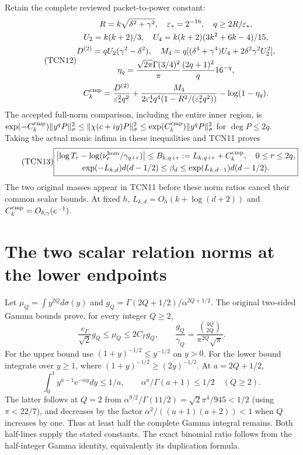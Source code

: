 \documentclass[11pt,a4paper]{article}
\begin{document}
Retain the complete reviewed packet-to-power constant:
\begin{equation}\tag{TCN12}
 \begin{gathered}
 R=k\sqrt{\delta^2+\gamma^2},\quad\varepsilon_*=2^{-16},
 \quad q\ge 2R/\varepsilon_*,\\
 U_2=k(k+2)/3,\quad U_4=k(k+2)(3k^2+6k-4)/15,\\
 D^{(2)}=qU_2(\gamma^2-\delta^2),\quad
 M_4=q[(\delta^4+\gamma^4)U_4+2\delta^2\gamma^2U_2^2],\\
 \eta_q=\frac{\sqrt{2\pi}\Gamma(3/4)^2}{\pi}
                  \frac{(2q+1)^2}{q}16^{-q},\\
 C_k^{\rm cmp}=\frac{D^{(2)}}{\varepsilon_*^2q^2}
 +\frac{M_4}{2\varepsilon_*^4q^4(1-R^2/(\varepsilon_*^2q^2))}
 -\log(1-\eta_q).
 \end{gathered}
\end{equation}
The accepted full-norm comparison, including the entire inner region,
is $\exp(-C_k^{\rm cmp})\|y^qP\|_\sigma^2\le
\|\chi(c+iy)P\|_\sigma^2\le
\exp(C_k^{\rm cmp})\|y^qP\|_\sigma^2$ for $\deg P\le2q$.
Taking the actual monic infima in these inequalities and TCN11 proves
\begin{equation}\tag{TCN13}\label{tcn:comparison}
 \boxed{\begin{gathered}
 \left|\log T_r-\log(\nu_r^{\rm hom}/\gamma_{q+r})\right|
       \le B_{k,q+r}:=L_{k,q+r}+C_k^{\rm cmp},\quad0\le r\le2q,\\
 \exp(-L_{k,d})d(d-1/2)\le\beta_d
       \le\exp(L_{k,d-1})d(d-1/2).
 \end{gathered}}
\end{equation}
The two original masses appear in TCN11 before these norm ratios cancel
their common scalar bounds. At fixed $h$, $L_{k,d}=O_h(k+\log(d+2))$
and $C_k^{\rm cmp}=O_{\delta,\gamma}(e^{-1})$.

\section{The two scalar relation norms at the lower endpoints}

Let $\mu_Q=\int y^{2Q}d\sigma(y)$ and
$g_Q=\Gamma(2Q+1/2)/\alpha^{2Q+1/2}$. The original two-sided Gamma
bounds prove, for every integer $Q\ge2$,
\begin{equation}\tag{TCN14}
 \frac{c_\Gamma}{\sqrt2}g_Q\le\mu_Q\le2C_\Gamma g_Q,
 \qquad
 \frac{g_Q}{\gamma_Q}
       =\frac{\binom{4Q}{2Q}}{\pi^{2Q}\sqrt\pi}.
\end{equation}
For the upper bound use $(1+y)^{-1/2}\le y^{-1/2}$ on $y>0$.
For the lower bound integrate over $y\ge1$, where
$(1+y)^{-1/2}\ge(2y)^{-1/2}$. At $a=2Q+1/2$,
\[
 \int_0^1 y^{a-1}e^{-\alpha y}dy\le1/a,
 \qquad \alpha^a/\Gamma(a+1)\le1/2\quad(Q\ge2).
\]
The latter follows at $Q=2$ from
$\alpha^{9/2}/\Gamma(11/2)=\sqrt2\pi^4/945<1/2$
(using $\pi<22/7$), and decreases by the factor
$\alpha^2/((a+1)(a+2))<1$ when $Q$ increases by one.
Thus at least half the complete Gamma integral remains. Both half-lines
supply the stated constants. The exact binomial ratio follows from the
half-integer Gamma identity, equivalently its duplication formula.
\end{document}
